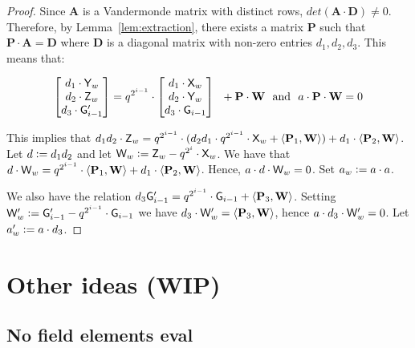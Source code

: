 \documentclass[12pt]{article}
\theoremstyle{Definition}
\begin{document}
\begin{proof}
Since $\mathbf{A}$ is a Vandermonde matrix with distinct rows, $det(\mathbf{A} \cdot \mathbf{D}) \neq 0$. Therefore, by Lemma~\ref{lem:extraction}, there exists a matrix $\mathbf{P}$ such that $\mathbf{P}\cdot \mathbf{A} = \mathbf{D}$ where $\mathbf{D}$ is a diagonal matrix with non-zero entries $d_1, d_2, d_3$. This means that: 

$$  
\begin{bmatrix}
d_1 \cdot \mathsf{Y}_w \\ 
d_2 \cdot \mathsf{Z}_w \\ 
d_3 \cdot \mathsf{G}'_{i-1}
\end{bmatrix} 
= 
q^{2^{i-1}} \cdot
\begin{bmatrix}
d_1 \cdot \mathsf{X}_{w} \\ 
d_2 \cdot \mathsf{Y}_{w} \\ 
d_3 \cdot \mathsf{G}_{i-1}
\end{bmatrix}  \ \
+ 
\mathbf{P} \cdot 
\mathbf{W} \ \ \text{and} \ \ a \cdot \mathbf{P} \cdot \mathbf{W} = 0
$$

This implies that $d_1 d_2 \cdot \mathsf{Z}_w = q^{2^{i-1}} \cdot (d_2 d_1 \cdot q^{2^{i-1}} \cdot \mathsf{X}_w + \langle \mathbf{P}_1, \mathbf{W} \rangle) + d_1 \cdot \langle \mathbf{P}_2, \mathbf{W} \rangle$. Let $d \mathrel{\mathop:}= d_1 d_2$ and let $\mathsf{W}_w \mathrel{\mathop:}= \mathsf{Z}_w - q^{2^{i}} \cdot \mathsf{X}_w$. 
We have that $d \cdot \mathsf{W}_w = q^{2^{i-1}} \cdot \langle \mathbf{P}_1, \mathbf{W} \rangle  + d_1 \cdot \langle \mathbf{P}_2, \mathbf{W} \rangle$. Hence, $a \cdot d \cdot \mathsf{W}_w = 0$. Set $a_w \mathrel{\mathop:}= a \cdot a$. 
 
We also have the relation $d_3 \mathsf{G}'_{i-1} = q^{2^{i-1}} \cdot \mathsf{G}_{i-1} + \langle \mathbf{P}_3, \mathbf{W} \rangle$. Setting $\mathsf{W}'_w \mathrel{\mathop:}= \mathsf{G}'_{i-1} - q^{2^{i-1}} \cdot \mathsf{G}_{i-1}$ we have $d_3 \cdot \mathsf{W}'_w = \langle \mathbf{P}_3, \mathbf{W} \rangle$, hence $a \cdot d_3 \cdot \mathsf{W}'_w = 0$. Let $a'_w \mathrel{\mathop:}= a \cdot d_3$.  
	\end{proof}


\section{Other ideas (WIP)}
\subsection{No field elements eval}
\end{document}

